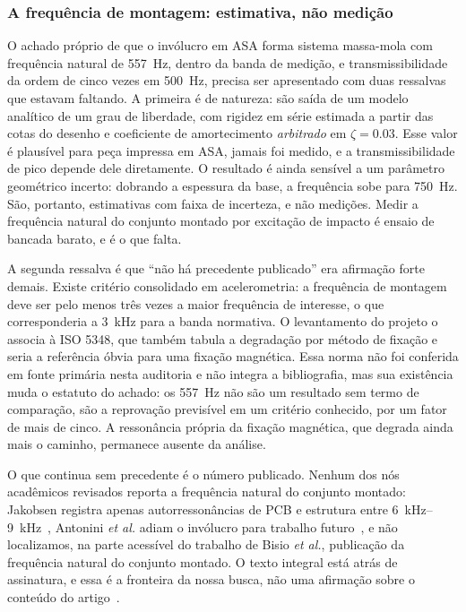 \documentclass[11pt,a4paper]{article}
\begin{document}
\subsubsection{A frequência de montagem: estimativa, não medição}

O achado próprio de que o invólucro em ASA forma sistema massa-mola com frequência natural
de \SI{557}{\hertz}, dentro da banda de medição, e transmissibilidade da ordem de cinco
vezes em \SI{500}{\hertz}, precisa ser apresentado com duas ressalvas que estavam
faltando. A primeira é de natureza: são saída de um modelo analítico de um grau de
liberdade, com rigidez em série estimada a partir das cotas do desenho e coeficiente de
amortecimento \emph{arbitrado} em $\zeta = \num{0,03}$. Esse valor é plausível para peça
impressa em ASA, jamais foi medido, e a transmissibilidade de pico depende dele
diretamente. O resultado é ainda sensível a um parâmetro geométrico incerto: dobrando a
espessura da base, a frequência sobe para \SI{750}{\hertz}. São, portanto, estimativas com
faixa de incerteza, e não medições. Medir a frequência natural do conjunto montado por
excitação de impacto é ensaio de bancada barato, e é o que falta.

A segunda ressalva é que ``não há precedente publicado'' era afirmação forte demais. Existe
critério consolidado em acelerometria: a frequência de montagem deve ser pelo menos três
vezes a maior frequência de interesse, o que corresponderia a \SI{3}{\kilo\hertz} para a
banda normativa. O levantamento do projeto o associa à ISO 5348, que também tabula a
degradação por método de fixação e seria a referência óbvia para uma fixação magnética.
Essa norma não foi conferida em fonte primária nesta auditoria e não integra a
bibliografia, mas sua existência muda o estatuto do achado: os \SI{557}{\hertz} não são um
resultado sem termo de comparação, são a reprovação previsível em um critério conhecido,
por um fator de mais de cinco. A ressonância própria da fixação magnética, que degrada
ainda mais o caminho, permanece ausente da análise.

O que continua sem precedente é o número publicado. Nenhum dos nós acadêmicos revisados
reporta a frequência natural do conjunto montado: Jakobsen registra apenas
autorressonâncias de PCB e estrutura entre \SIrange{6}{9}{\kilo\hertz}~\cite{jakobsen2024},
Antonini \emph{et al.} adiam o invólucro para trabalho futuro~\cite{antonini2023}, e
não localizamos, na parte acessível do trabalho de Bisio \emph{et al.}, publicação da
frequência natural do conjunto montado. O texto integral está atrás de assinatura, e
essa é a fronteira da nossa busca, não uma afirmação sobre o conteúdo do
artigo~\cite{bisio2025}.
\end{document}

